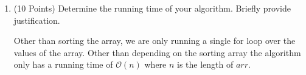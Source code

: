 \documentclass{article}
\renewcommand{\O}{\mathcal{O}}
\newcounter{ProblemCounter}
\newenvironment{problem}[1][Problem]{
 \begin{trivlist}
 \item[\hskip \labelsep {\bfseries #1}\hskip \labelsep {%
 \bfseries \theProblemCounter.%
 \stepcounter{ProblemCounter}%
 }]
}{
 \end{trivlist}
}
\begin{document}
\begin{problem}
\begin{enumerate}[label=\textbf{\alph*.)}]
    \item (10 Points) Determine the running time of your algorithm. Briefly provide justification.
    
    Other than sorting the array, we are only running a single for loop over the values of the array. Other than depending on the sorting array the algorithm only has a running time of $\O(n)$ where $n$ is the length of $arr$.
    
\end{enumerate}
\end{problem}
\end{document}
